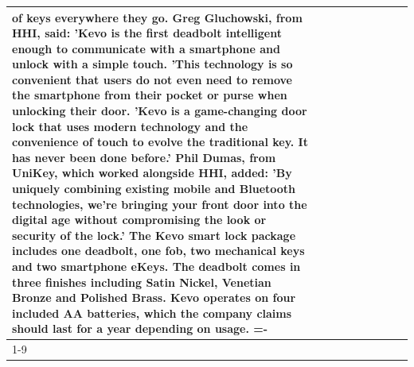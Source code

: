 \begin{table}[H]
\begin{tabular}{lllrlllll}
of keys everywhere they go. Greg Gluchowski, from HHI, said: 'Kevo is the first deadbolt intelligent enough to communicate with a smartphone and unlock with a simple touch. 'This technology is so convenient that users do not even need to remove the smartphone from their pocket or purse when unlocking their door. 'Kevo is a game-changing door lock that uses modern technology and the convenience of touch to evolve the traditional key. It has never been done before.' Phil Dumas, from UniKey, which worked alongside HHI, added: 'By uniquely combining existing mobile and Bluetooth technologies, we’re bringing your front door into the digital age without compromising the look or security of the lock.' The Kevo smart lock package includes one deadbolt, one fob, two mechanical keys and two smartphone eKeys. The deadbolt comes in three finishes including Satin Nickel, Venetian Bronze and Polished Brass. Kevo operates on four included AA batteries, which the company claims should last for a year depending on usage. =- \\
\cline{1-9}

\end{tabular}
\end{table}
